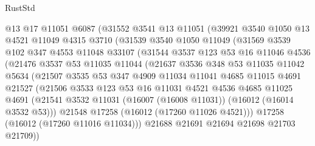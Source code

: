 \begin{lexlean}{RustStd}
\begin{coremodule}
            @13
            @17
            @11051
            @6087
            (@31552
              @3541
              @13
              @11051
              (@39921
                @3540
                @1050
                @13
                @4521
                @11049
                @4315
                @3710
                (@31539
                  @3540
                  @1050
                  @11049
                  (@31569
                    @3539
                    @102
                    @347
                    @4553
                    @11048
                    @33107
                    (@31544
                      @3537
                      @123
                      @53
                      @16
                      @11046
                      @4536
                      (@21476
                        @3537
                        @53
                        @11035
                        @11044
                        (@21637
                          @3536
                          @348
                          @53
                          @11035
                          @11042
                          @5634
                          (@21507
                            @3535
                            @53
                            @347
                            @4909
                            @11034
                            @11041
                            @4685
                            @11015
                            @4691
                            @21527
                            (@21506
                              @3533
                              @123
                              @53
                              @16
                              @11031
                              @4521
                              @4536
                              @4685
                              @11025
                              @4691
                              (@21541
                                @3532
                                @11031
                                (@16007 (@16008 @11031))
                                (@16012 (@16014 @3532 @53)))
                              @21548
                              @17258
                              (@16012 (@17260 @11026 @4521)))
                            @17258
                            (@16012 (@17260 @11016 @11034)))
                          @21688
                          @21691
                          @21694
                          @21698
                          @21703
                          @21709))

\end{coremodule}
\end{lexlean}
